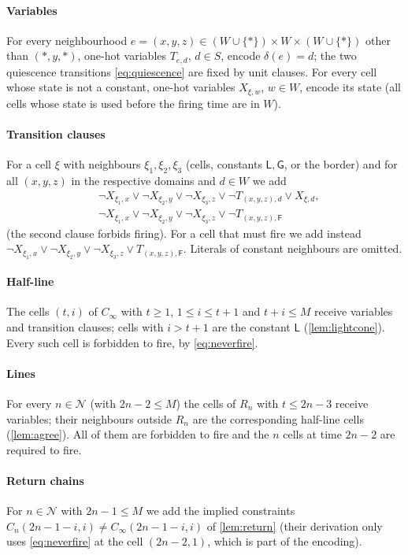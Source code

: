 \paragraph{Variables}
For every neighbourhood $e=(x,y,z)\in(W\cup\{\ast\})\times W\times(W\cup\{\ast\})$
other than $(\ast,y,\ast)$, one-hot variables $T_{e,d}$, $d\in S$, encode
$\delta(e)=d$; the two quiescence transitions \eqref{eq:quiescence} are fixed
by unit clauses. For every cell whose state is not a constant, one-hot
variables $X_{\xi,w}$, $w\in W$, encode its state (all cells whose state is
used before the firing time are in $W$).

\paragraph{Transition clauses}
For a cell $\xi$ with neighbours $\xi_1,\xi_2,\xi_3$ (cells, constants $\mathsf L,
\mathsf G$, or the border) and for all $(x,y,z)$ in the respective domains
and $d\in W$ we add
\begin{align*}
&\neg X_{\xi_1,x}\vee\neg X_{\xi_2,y}\vee\neg X_{\xi_3,z}\vee\neg T_{(x,y,z),d}\vee X_{\xi,d},\\
&\neg X_{\xi_1,x}\vee\neg X_{\xi_2,y}\vee\neg X_{\xi_3,z}\vee\neg T_{(x,y,z),\mathsf F}
\end{align*}
(the second clause forbids firing). For a cell that must fire we add instead
$\neg X_{\xi_1,x}\vee\neg X_{\xi_2,y}\vee\neg X_{\xi_3,z}\vee T_{(x,y,z),\mathsf F}$.
Literals of constant neighbours are omitted.

\paragraph{Half-line} The cells $(t,i)$ of $C_\infty$ with $t\ge1$,
$1\le i\le t+1$ and $t+i\le M$ receive variables and transition clauses; cells with
$i>t+1$ are the constant $\mathsf L$ (\cref{lem:lightcone}). Every such cell
is forbidden to fire, by \eqref{eq:neverfire}.

\paragraph{Lines} For every $n\in\mathcal N$ (with $2n-2\le M$) the cells of
$R_n$ with $t\le 2n-3$ receive variables; their neighbours outside $R_n$ are
the corresponding half-line cells (\cref{lem:agree}). All of them are
forbidden to fire and the $n$ cells at time $2n-2$ are required to fire.

\paragraph{Return chains} For $n\in\mathcal N$ with $2n-1\le M$ we add the
implied constraints $C_n(2n-1-i,i)\ne C_\infty(2n-1-i,i)$ of
\cref{lem:return} (their derivation only uses \eqref{eq:neverfire} at the
cell $(2n-2,1)$, which is part of the encoding).

